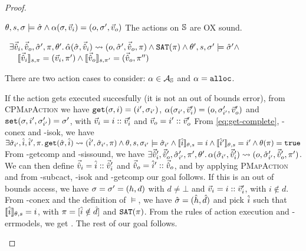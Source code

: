 \begin{proof}


\pfassume \begin{hypvlist}
 $\theta,s,\st\models\sst \land \ppexecc{\alpha}{\st,\ins}{o,\st',\outs}$
 The actions on $\mmdl$ are OX sound.
\end{hypvlist}
\pfprove \begin{goalvlist}
 $
\begin{array}{l}
\exists \sins,\souts,\sst',\pc,\theta'\ldotp \ppexec{\hat\alpha}{\sst,\sins}{o,\sst',\souts,\pc} \land \SAT(\pc) \land \theta',s,\st'\models \sst' \land\\
\quad \expeval[s,\pc]{\sins}=(\ins,\pc')\land\expeval[s,\pc']{\souts}=(\souts,\pc'')
\end{array}$
\end{goalvlist}

There are two action cases to consider: $\alpha\in\actions_\mmdl$ and $\alpha=\alloc$.

\pfcase{$\alpha\in\actions_\mmdl$}

\begin{hypvlist}
 If the action gets executed succesfully (it is not an out of bounds error), from \textsc{CPMapAction} we have $\ppgetc{\st,i}{i',\st_{i'}}$,  $\ppexecc{\alpha}{\st_{i'},\ins'}{o,\st'_{i'},\outs'}$ and $\ppset{\st,i',\st'_{i'}}{\st'}$, with $\ins=i::\ins'$ and $\outs=i'::\outs'$
 From \ref{eq:get-complete}, \hyp{conex} and \hyp{isok}, we have $\exists \sst_{i'}, \sym i, \sym i', \pc \ldotp \ppget{\sst,\sym i}{\sym i', \sst_{i'}, \pc} \land \theta,s,\st_{i'}\models\sst_{i'} \land \expeval{\sym i}=i \land \expeval{\sym i'}=i' \land \theta(\pc)=\vtrue$
 From \hyp{getcomp} and \hyp{sissound}, we have $\exists \sins',\souts',\sst'_{i'},\pc',\theta'\ldotp \ppexec{\alpha}{\sst_{i'},\sins'}{o,\sst'_{i'},\souts',\pc'}$. 
 We can then define $\sins=\sym i::\sins'$ and $\souts=\sym i'::\souts$, and by applying \textsc{PMapAction} and from \hyp{subcact}, \hyp{isok} and \hyp{getcomp} our goal  follows.
 If this is an out of bounds access, we have $\st=\st'=(h,d)$ with $d\neq\bot$ and $\ins=i::\ins'$, with $i\notin d$. 
 From \hyp{conex} and the definition of $\models$, we have $\sst=(\sym h, \sym d)$ and pick $\sym i$ such that $\expeval{\sym i}=i$, with $\pc=[\sym i\notin \sym d]$ and $\SAT(\pc)$. 
 From the rules of action execution and \hyp{errmodels}, we get . The rest of our goal  follows.
\end{hypvlist}


\end{proof}
